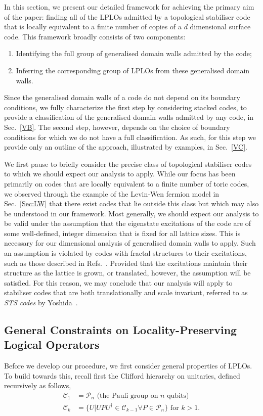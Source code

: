 \documentclass[pra,twocolumn,a4paper,nofootinbib]{revtex4-1}
\begin{document}
In this section, we present our detailed framework for achieving the primary aim of the paper: finding all of the LPLOs admitted by a topological stabiliser code that is locally equivalent to a finite number of copies of a $d$ dimensional surface code. This framework broadly consists of two components:
\begin{enumerate}
\item Identifying the full group of generalised domain walls admitted by the code;
\item Inferring the corresponding group of LPLOs from these generalised domain walls.
\end{enumerate}
Since the generalised domain walls of a code do not depend on its boundary conditions, we fully characterize the first step by considering stacked codes, to provide a classification of the generalised domain walls admitted by any code, in Sec.~\ref{VB}. The second step, however, depends on the choice of boundary conditions for which we do not have a full classification.  As such, for this step we provide only an outline of the approach, illustrated by examples, in Sec.~\ref{VC}.

We first pause to briefly consider the precise class of topological stabiliser codes to which we should expect our analysis to apply. While our focus has been primarily on codes that are locally equivalent to a finite number of toric codes, we observed through the example of the Levin-Wen fermion model in Sec.~\ref{Sec:LW} that there exist codes that lie outside this class but which may also be understood in our framework. Most generally, we should expect our analysis to be valid under the assumption that the eigenstate excitations of the code are of some well-defined, integer dimension that is fixed for all lattice sizes. This is necessary for our dimensional analysis of generalised domain walls to apply. Such an assumption is violated by codes with fractal structures to their excitations, such as those described in Refs.~\cite{HaahCode,BrellCode}. Provided that the excitations maintain their structure as the lattice is grown, or translated, however, the assumption will be satisfied. For this reason, we may conclude that our analysis will apply to stabiliser codes that are both translationally and scale invariant, referred to as \emph{STS codes} by Yoshida~\cite{YoshidaD}.


\subsection{General Constraints on Locality-Preserving Logical Operators}
\label{VA}
Before we develop our procedure, we first consider general properties of LPLOs. To build towards this, recall first the Clifford hierarchy on unitaries, defined recursively as follows,
\begin{align}
\mathcal{C}_1 &= \mathcal{P}_n \text{ (the Pauli group on $n$ qubits)}\\
\mathcal{C}_k &= \{U|UPU^\dag \in \mathcal{C}_{k-1} \forall P \in \mathcal{P}_n\} \text{ for $k>1$}.
\end{align}
\end{document}
